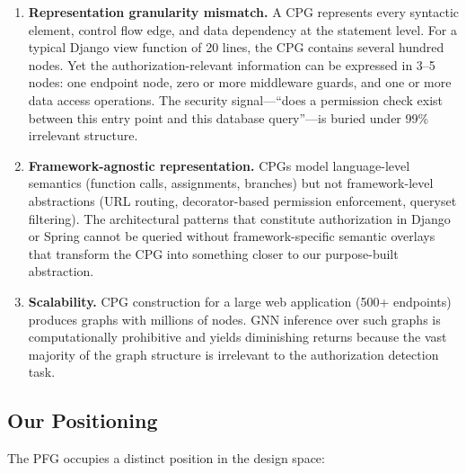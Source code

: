 \begin{enumerate}
    \item \textbf{Representation granularity mismatch.} A CPG represents every syntactic element, control flow edge, and data dependency at the statement level. For a typical Django view function of 20 lines, the CPG contains several hundred nodes. Yet the authorization-relevant information can be expressed in 3--5 nodes: one endpoint node, zero or more middleware guards, and one or more data access operations. The security signal—``does a permission check exist between this entry point and this database query''—is buried under 99\% irrelevant structure.

    \item \textbf{Framework-agnostic representation.} CPGs model language-level semantics (function calls, assignments, branches) but not framework-level abstractions (URL routing, decorator-based permission enforcement, queryset filtering). The architectural patterns that constitute authorization in Django or Spring cannot be queried without framework-specific semantic overlays that transform the CPG into something closer to our purpose-built abstraction.

    \item \textbf{Scalability.} CPG construction for a large web application (500+ endpoints) produces graphs with millions of nodes. GNN inference over such graphs is computationally prohibitive and yields diminishing returns because the vast majority of the graph structure is irrelevant to the authorization detection task.
\end{enumerate}

\subsection{Our Positioning}

The PFG occupies a distinct position in the design space:

